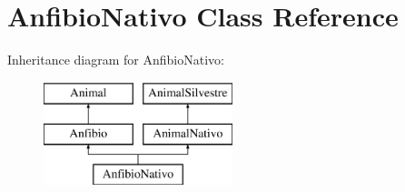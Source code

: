 \hypertarget{class_anfibio_nativo}{}\section{Anfibio\+Nativo Class Reference}
\label{class_anfibio_nativo}
Inheritance diagram for Anfibio\+Nativo\+:\begin{figure}[H]
\begin{center}
\leavevmode
\includegraphics[height=3.000000cm]{class_anfibio_nativo}
\end{center}
\end{figure}
